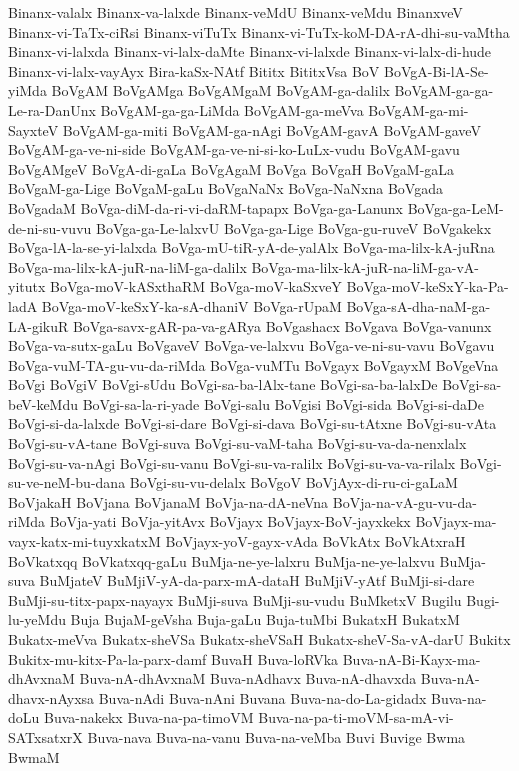 {Binanx-valalx
Binanx-va-lalxde
Binanx-veMdU
Binanx-veMdu
BinanxveV
Binanx-vi-TaTx-ciRsi
Binanx-viTuTx
Binanx-vi-TuTx-koM-DA-rA-dhi-su-vaMtha
Binanx-vi-lalxda
Binanx-vi-lalx-daMte
Binanx-vi-lalxde
Binanx-vi-lalx-di-hude
Binanx-vi-lalx-vayAyx
Bira-kaSx-NAtf
Bititx
BititxVsa
BoV
BoVgA-Bi-lA-Se-yiMda
BoVgAM
BoVgAMga
BoVgAMgaM
BoVgAM-ga-dalilx
BoVgAM-ga-ga-Le-ra-DanUnx
BoVgAM-ga-ga-LiMda
BoVgAM-ga-meVva
BoVgAM-ga-mi-SayxteV
BoVgAM-ga-miti
BoVgAM-ga-nAgi
BoVgAM-gavA
BoVgAM-gaveV
BoVgAM-ga-ve-ni-side
BoVgAM-ga-ve-ni-si-ko-LuLx-vudu
BoVgAM-gavu
BoVgAMgeV
BoVgA-di-gaLa
BoVgAgaM
BoVga
BoVgaH
BoVgaM-gaLa
BoVgaM-ga-Lige
BoVgaM-gaLu
BoVgaNaNx
BoVga-NaNxna
BoVgada
BoVgadaM
BoVga-diM-da-ri-vi-daRM-tapapx
BoVga-ga-Lanunx
BoVga-ga-LeM-de-ni-su-vuvu
BoVga-ga-Le-lalxvU
BoVga-ga-Lige
BoVga-gu-ruveV
BoVgakekx
BoVga-lA-la-se-yi-lalxda
BoVga-mU-tiR-yA-de-yalAlx
BoVga-ma-lilx-kA-juRna
BoVga-ma-lilx-kA-juR-na-liM-ga-dalilx
BoVga-ma-lilx-kA-juR-na-liM-ga-vA-yitutx
BoVga-moV-kASxthaRM
BoVga-moV-kaSxveY
BoVga-moV-keSxY-ka-Pa-ladA
BoVga-moV-keSxY-ka-sA-dhaniV
BoVga-rUpaM
BoVga-sA-dha-naM-ga-LA-gikuR
BoVga-savx-gAR-pa-va-gARya
BoVgashacx
BoVgava
BoVga-vanunx
BoVga-va-sutx-gaLu
BoVgaveV
BoVga-ve-lalxvu
BoVga-ve-ni-su-vavu
BoVgavu
BoVga-vuM-TA-gu-vu-da-riMda
BoVga-vuMTu
BoVgayx
BoVgayxM
BoVgeVna
BoVgi
BoVgiV
BoVgi-sUdu
BoVgi-sa-ba-lAlx-tane
BoVgi-sa-ba-lalxDe
BoVgi-sa-beV-keMdu
BoVgi-sa-la-ri-yade
BoVgi-salu
BoVgisi
BoVgi-sida
BoVgi-si-daDe
BoVgi-si-da-lalxde
BoVgi-si-dare
BoVgi-si-dava
BoVgi-su-tAtxne
BoVgi-su-vAta
BoVgi-su-vA-tane
BoVgi-suva
BoVgi-su-vaM-taha
BoVgi-su-va-da-nenxlalx
BoVgi-su-va-nAgi
BoVgi-su-vanu
BoVgi-su-va-ralilx
BoVgi-su-va-va-rilalx
BoVgi-su-ve-neM-bu-dana
BoVgi-su-vu-delalx
BoVgoV
BoVjAyx-di-ru-ci-gaLaM
BoVjakaH
BoVjana
BoVjanaM
BoVja-na-dA-neVna
BoVja-na-vA-gu-vu-da-riMda
BoVja-yati
BoVja-yitAvx
BoVjayx
BoVjayx-BoV-jayxkekx
BoVjayx-ma-vayx-katx-mi-tuyxkatxM
BoVjayx-yoV-gayx-vAda
BoVkAtx
BoVkAtxraH
BoVkatxqq
BoVkatxqq-gaLu
BuMja-ne-ye-lalxru
BuMja-ne-ye-lalxvu
BuMja-suva
BuMjateV
BuMjiV-yA-da-parx-mA-dataH
BuMjiV-yAtf
BuMji-si-dare
BuMji-su-titx-papx-nayayx
BuMji-suva
BuMji-su-vudu
BuMketxV
Bugilu
Bugi-lu-yeMdu
Buja
BujaM-geVsha
Buja-gaLu
Buja-tuMbi
BukatxH
BukatxM
Bukatx-meVva
Bukatx-sheVSa
Bukatx-sheVSaH
Bukatx-sheV-Sa-vA-darU
Bukitx
Bukitx-mu-kitx-Pa-la-parx-damf
BuvaH
Buva-loRVka
Buva-nA-Bi-Kayx-ma-dhAvxnaM
Buva-nA-dhAvxnaM
Buva-nAdhavx
Buva-nA-dhavxda
Buva-nA-dhavx-nAyxsa
Buva-nAdi
Buva-nAni
Buvana
Buva-na-do-La-gidadx
Buva-na-doLu
Buva-nakekx
Buva-na-pa-timoVM
Buva-na-pa-ti-moVM-sa-mA-vi-SATxsatxrX
Buva-nava
Buva-na-vanu
Buva-na-veMba
Buvi
Buvige
Bwma
BwmaM
}
